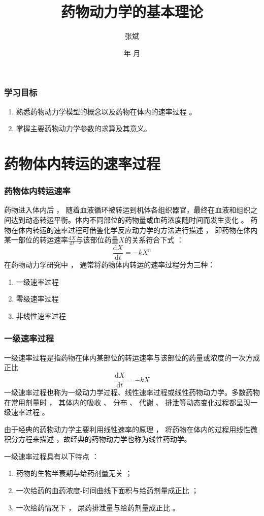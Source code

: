 \documentclass[dvipsnames, svgnames, x11names]{beamer}
\title{药物动力学的基本理论}
\author{张斌}
\institute[理工系]{河北农业大学 理工系}
\date{\the\year 年 \the\month 月}
\begin{document}
	
	\begin{frame}
		\titlepage
		\thispagestyle{empty}
		\addtocounter{framenumber}{-1}
	\end{frame}


\begin{frame}
	\frametitle{学习目标}
	\begin{enumerate}
	  \item 熟悉药物动力学模型的概念以及药物在体内的速率过程 。
	  \item 掌握主要药物动力学参数的求算及其意义。
	\end{enumerate}
\end{frame}


\begin{frame}{}
	\begin{center}
		{\Huge {}}
	\end{center}
	\tableofcontents[subsectionstyle=hide/hide/show]
	\thispagestyle{empty}
	\addtocounter{framenumber}{-1}
\end{frame}


\section{药物体内转运的速率过程}


\begin{frame}
    \frametitle{药物体内转运速率}
	药物进入体内后 ， 随着血液循环被转运到机体各组织器官，最终在血液和组织之间达到动态转运平衡。体内不同部位的药物量或血药浓度随时间而发生变化 。 药物在体内转运的速率过程可借鉴化学反应动力学的方法进行描述 ， 即药物在体内某一部位的转运速率$\frac{\mathrm{d}X}{\mathrm{d}t}$与该部位药量$X$的关系符合下式 ：
	\[
		\frac{\mathrm{d}X}{\mathrm{d}t}=-kX^n
	\]
	在药物动力学研究中 ， 通常将药物体内转运的速率过程分为三种：
	\begin{enumerate}
	  \item 一级速率过程
	  \item 零级速率过程
	  \item 非线性速率过程
	\end{enumerate}
\end{frame}


\begin{frame}
	\frametitle{一级速率过程}
	一级速率过程是指药物在体内某部位的转运速率与该部位的药量或浓度的一次方成正比
	\[
		\frac{\mathrm{d}X}{\mathrm{d}t}=-kX
	\]
	一级速率过程也称为一级动力学过程、线性速率过程或线性药物动力学。多数药物在常用剂量时 ， 其体内的吸收 、 分布 、 代谢 、 排泄等动态变化过程都呈现一级速率过程 。
	
	由于经典的药物动力学主要利用线性速率的原理 ， 将药物在体内的过程用线性微积分方程来描述 ，故经典的药物动力学也称为线性药动学。

	一级速率过程具有以下特点 ：
	\begin{enumerate}
	  \item 药物的生物半衰期与给药剂量无关 ；
	  \item 一次给药的血药浓度-时间曲线下面积与给药剂量成正比 ；
	  \item 一次给药情况下 ， 尿药排泄量与给药剂量成正比 。
	\end{enumerate}
\end{frame}
\end{document}

